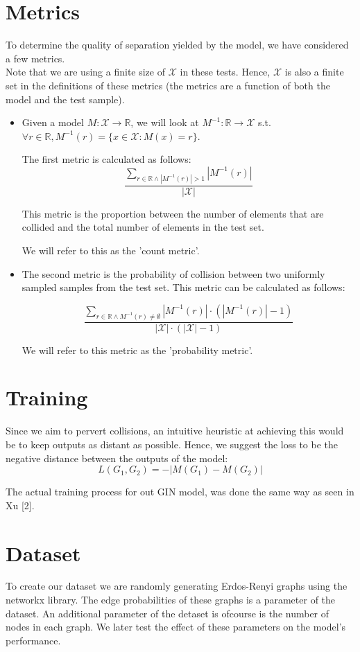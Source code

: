 \documentclass{article}
\begin{document}
\section*{Metrics}
To determine the quality of separation yielded by the model, we have considered a few metrics.\\
Note that we are using a finite size of $\mathcal{X}$ in these tests. Hence, $\mathcal{X}$
is also a finite set in the definitions of these metrics (the metrics are a function of both the model and the test sample).
\begin{itemize}
    \item Given a model $M:\mathcal{X}\rightarrow\mathbb{R}$, 
    we will look at $M^{-1}:\mathbb{R}\rightarrow\mathcal{X}$ s.t. 
    $\forall r\in\mathbb{R}, M^{-1}(r)=\{x\in\mathcal{X}:M(x)=r\}$.

    The first metric is calculated as follows:
    \[
        \frac{\sum_{r\in\mathbb{R}\wedge |M^{-1}(r)|>1}|M^{-1}(r)|}
        {|\mathcal{X}|}
    \]

    This metric is the proportion between the number of elements 
    that are collided and the total number of elements in the test set.
    
    We will refer to this as the 'count metric'.

    \item The second metric is the probability of collision
    between two uniformly sampled samples from the test set.
    This metric can be calculated as follows:

    \[
        \frac{\sum_{r\in\mathbb{R}\wedge M^{-1}(r)\neq\emptyset}|M^{-1}(r)|\cdot\left(|M^{-1}(r)|-1\right)}
        {|\mathcal{X}|\cdot\left(|\mathcal{X}|-1\right)}
    \]

    We will refer to this metric as the 'probability metric'.
\end{itemize}


\section*{Training}
Since we aim to pervert collisions, an intuitive heuristic at achieving this would be to keep
outputs as distant as possible.
Hence, we suggest the loss to be the negative distance between the outputs of the model:
\[
    L(G_1,G_2)=-|M(G_1)-M(G_2)|    
\]

The actual training process for out GIN model, was done the same way as seen in  Xu [2].

\section*{Dataset}
To create our dataset we are randomly generating Erdos-Renyi graphs using the networkx library. The edge probabilities of
these graphs is a parameter of the dataset. An additional parameter of the detaset is ofcourse is the number
of nodes in each graph. We later test the effect of these parameters on the model's performance.\\
\end{document}
